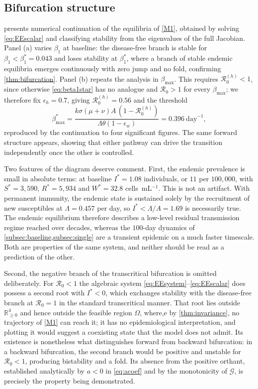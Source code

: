 \documentclass[11pt]{article}
\theoremstyle{plain}
\theoremstyle{definition}
\theoremstyle{remark}
\newcommand{\Rz}{\mathcal{R}_0}
\newcommand{\Rzh}{\mathcal{R}_0^{(h)}}
\begin{document}
\subsection{Bifurcation structure}\label{subsec:bifurcation_num}

 presents numerical continuation of the equilibria of \eqref{M1}, obtained by solving \eqref{eq:EEscalar} and classifying stability from the eigenvalues of the full Jacobian. Panel (a) varies $\beta_1$ at baseline: the disease-free branch is stable for $\beta_1<\beta_1^*=0.043$ and loses stability at $\beta_1^*$, where a branch of stable endemic equilibria emerges continuously with zero jump and no fold, confirming \cref{thm:bifurcation}. Panel (b) repeats the analysis in $\beta_{\max}$. This requires $\Rzh<1$, since otherwise \eqref{eq:beta1star} has no analogue and $\Rz>1$ for every $\beta_{\max}$; we therefore fix $\epsilon_h=0.7$, giving $\Rzh=0.56$ and the threshold
\[
\beta_{\max}^*=\frac{k\sigma(\mu+\nu)A\,(1-\Rzh)}{\Lambda\theta(1-\epsilon_w)}=0.396~\text{day}^{-1},
\]
reproduced by the continuation to four significant figures. The same forward structure appears, showing that either pathway can drive the transition independently once the other is controlled.

Two features of the diagram deserve comment. First, the endemic prevalence is small in absolute terms: at baseline $I^*=1.08$ individuals, or $11$ per $100{,}000$, with $S^*=3{,}590$, $R^*=5{,}934$ and $W^*=32.8$ cells~mL$^{-1}$. This is not an artifact. With permanent immunity, the endemic state is sustained solely by the recruitment of new susceptibles at $\Lambda=0.457$ per day, so $I^*<\Lambda/A=1.69$ is necessarily true. The endemic equilibrium therefore describes a low-level residual transmission regime reached over decades, whereas the $100$-day dynamics of \cref{subsec:baseline,subsec:single} are a transient epidemic on a much faster timescale. Both are properties of the same system, and neither should be read as a prediction of the other.

Second, the negative branch of the transcritical bifurcation is omitted deliberately. For $\Rz<1$ the algebraic system \eqref{eq:EEsystem}--\eqref{eq:EEscalar} does possess a second root with $I^*<0$, which exchanges stability with the disease-free branch at $\Rz=1$ in the standard transcritical manner. That root lies outside $\mathbb{R}^4_{\ge0}$ and hence outside the feasible region $\Omega$, where,e by \cref{thm:invariance}, no trajectory of \eqref{M1} can reach it; it has no epidemiological interpretation, and plotting it would suggest a coexisting state that the model does not admit. Its existence is nonetheless what distinguishes forward from backward bifurcation: in a backward bifurcation, the second branch would be positive and unstable for $\Rz<1$, producing bistability and a fold. Its absence from the positive orthant, established analytically by $a<0$ in \eqref{eq:acoef} and by the monotonicity of $\mathcal{G}$, is precisely the property being demonstrated.
\end{document}

